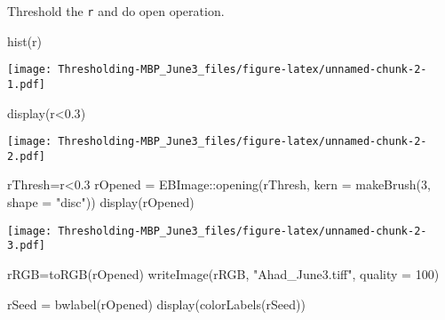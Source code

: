\documentclass[
]{article}
\newenvironment{Shaded}{\begin{snugshade}}{\end{snugshade}}
\newcommand{\AttributeTok}[1]{\textcolor[rgb]{0.77,0.63,0.00}{#1}}
\newcommand{\DecValTok}[1]{\textcolor[rgb]{0.00,0.00,0.81}{#1}}
\newcommand{\FloatTok}[1]{\textcolor[rgb]{0.00,0.00,0.81}{#1}}
\newcommand{\FunctionTok}[1]{\textcolor[rgb]{0.00,0.00,0.00}{#1}}
\newcommand{\NormalTok}[1]{#1}
\newcommand{\OtherTok}[1]{\textcolor[rgb]{0.56,0.35,0.01}{#1}}
\newcommand{\SpecialCharTok}[1]{\textcolor[rgb]{0.00,0.00,0.00}{#1}}
\newcommand{\StringTok}[1]{\textcolor[rgb]{0.31,0.60,0.02}{#1}}
\begin{document}
Threshold the \texttt{r} and do open operation.

\begin{Shaded}
\begin{Highlighting}[]
\FunctionTok{hist}\NormalTok{(r)}
\end{Highlighting}
\end{Shaded}

\texttt{[image: Thresholding-MBP\_June3\_files/figure-latex/unnamed-chunk-2-1.pdf]}

\begin{Shaded}
\begin{Highlighting}[]
\FunctionTok{display}\NormalTok{(r}\SpecialCharTok{\textless{}}\FloatTok{0.3}\NormalTok{)}
\end{Highlighting}
\end{Shaded}

\texttt{[image: Thresholding-MBP\_June3\_files/figure-latex/unnamed-chunk-2-2.pdf]}

\begin{Shaded}
\begin{Highlighting}[]
\NormalTok{rThresh}\OtherTok{=}\NormalTok{r}\SpecialCharTok{\textless{}}\FloatTok{0.3}
\NormalTok{rOpened }\OtherTok{=}\NormalTok{ EBImage}\SpecialCharTok{::}\FunctionTok{opening}\NormalTok{(rThresh,}
                            \AttributeTok{kern =} \FunctionTok{makeBrush}\NormalTok{(}\DecValTok{3}\NormalTok{, }\AttributeTok{shape =} \StringTok{"disc"}\NormalTok{))}
\FunctionTok{display}\NormalTok{(rOpened)}
\end{Highlighting}
\end{Shaded}

\texttt{[image: Thresholding-MBP\_June3\_files/figure-latex/unnamed-chunk-2-3.pdf]}

\begin{Shaded}
\begin{Highlighting}[]
\NormalTok{rRGB}\OtherTok{=}\FunctionTok{toRGB}\NormalTok{(rOpened)}
\FunctionTok{writeImage}\NormalTok{(rRGB, }\StringTok{"Ahad\_June3.tiff"}\NormalTok{, }\AttributeTok{quality =} \DecValTok{100}\NormalTok{)}
\end{Highlighting}
\end{Shaded}

\begin{Shaded}
\begin{Highlighting}[]
\NormalTok{rSeed }\OtherTok{=} \FunctionTok{bwlabel}\NormalTok{(rOpened)}
\FunctionTok{display}\NormalTok{(}\FunctionTok{colorLabels}\NormalTok{(rSeed))}
\end{Highlighting}
\end{Shaded}
\end{document}
